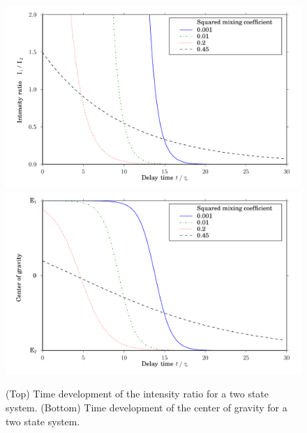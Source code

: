 \documentclass[12pt]{mitthesis}
\newcommand{\POINT}[1]{\textcolor{magenta}{\textbf{POINT:} #1}}
\begin{document}
\begin{figure}
  \caption{(Top) Time development of the intensity ratio for
    a two state system. (Bottom) Time development of the center of
    gravity for a two state system.}
  \label{fig:cog-devel}
  \centering
  \includegraphics[width=6in]{ratio-development.pdf}
  \includegraphics[width=6in]{cog-development.pdf}
\end{figure}


\end{document}
